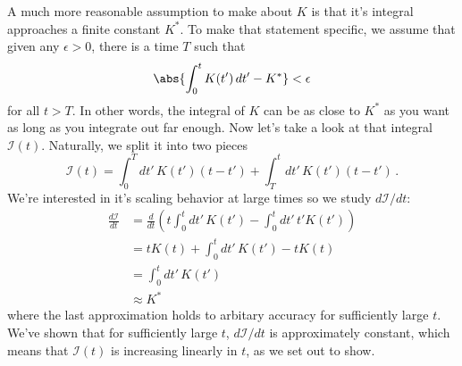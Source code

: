 A much more reasonable assumption to make about $K$ is that it's integral approaches a finite constant $K^*$.
To make that statement specific, we assume that given any $\epsilon > 0$, there is a time $T$ such that
\begin{equation*}
  \abs{\int_0^t K(t') \, dt' - K^*} < \epsilon
\end{equation*}
for all $t > T$.
In other words, the integral of $K$ can be as close to $K^*$ as you want as long as you integrate out far enough.
Now let's take a look at that integral $\mathcal{I}(t)$.
Naturally, we split it into two pieces
\begin{equation*}
  \mathcal{I}(t) = \int_0^T dt' \, K(t') (t - t') + \int_T^t dt' \, K(t')(t - t')
  \, .
\end{equation*}
We're interested in it's scaling behavior at large times so we study $d\mathcal{I}/dt$:
\begin{align*}
	\frac{d\mathcal{I}}{dt}
	&= \frac{d}{dt}
	\left(
		t \int_0^t dt' \, K(t') - \int_0^t dt' \, t' K(t')
	\right) \\
	&= t K(t) + \int_0^t dt' \, K(t') - t K(t) \\
	&= \int_0^t dt' \, K(t') \\
	&\approx K^*
\end{align*}
where the last approximation holds to arbitary accuracy for sufficiently large $t$.
We've shown that for sufficiently large $t$, $d\mathcal{I}/dt$ is approximately constant, which means that $\mathcal{I}(t)$ is increasing linearly in $t$, as we set out to show.


